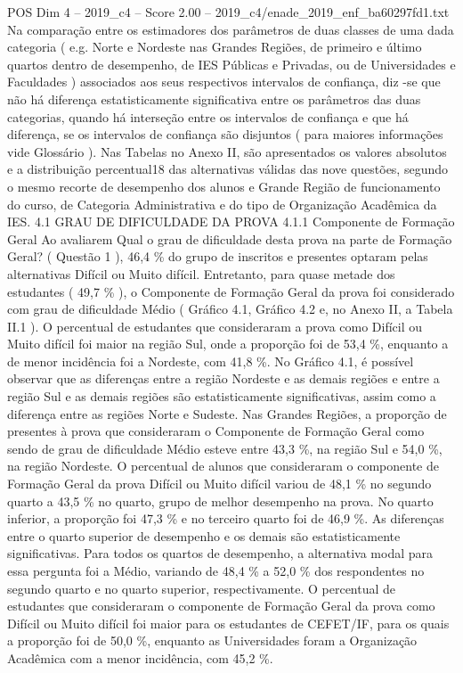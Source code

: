 \begin{textsample}{POS Dim 4 – 2019\_c4 – Score 2.00 – 2019\_c4/enade\_2019\_enf\_ba60297fd1.txt}
Na comparação entre os estimadores dos parâmetros de duas classes de uma dada categoria ( e.g.
Norte e Nordeste nas Grandes Regiões, de primeiro e último quartos dentro de desempenho, de IES Públicas e Privadas, ou de Universidades e Faculdades ) associados aos seus respectivos intervalos de confiança, diz -se que não há diferença estatisticamente significativa entre os parâmetros das duas categorias, quando há interseção entre os intervalos de confiança e que há diferença, se os intervalos de confiança são disjuntos ( para maiores informações vide Glossário ).
Nas Tabelas no Anexo II, são apresentados os valores absolutos e a distribuição percentual18 das alternativas válidas das nove questões, segundo o mesmo recorte de desempenho dos alunos e Grande Região de funcionamento do curso, de Categoria Administrativa e do tipo de Organização Acadêmica da IES. 4.1 GRAU DE DIFICULDADE DA PROVA 4.1.1 Componente de Formação Geral Ao avaliarem Qual o grau de dificuldade desta prova na parte de Formação Geral? ( Questão 1 ), 46,4 \% do grupo de inscritos e presentes optaram pelas alternativas Difícil ou Muito difícil.
Entretanto, para quase metade dos estudantes ( 49,7 \% ), o Componente de Formação Geral da prova foi considerado com grau de dificuldade Médio ( Gráfico 4.1, Gráfico 4.2 e, no Anexo II, a Tabela II.1 ).
O percentual de estudantes que consideraram a prova como Difícil ou Muito difícil foi maior na região Sul, onde a proporção foi de 53,4 \%, enquanto a de menor incidência foi a Nordeste, com 41,8 \%.
No Gráfico 4.1, é possível observar que as diferenças entre a região Nordeste e as demais regiões e entre a região Sul e as demais regiões são estatisticamente significativas, assim como a diferença entre as regiões Norte e Sudeste.
Nas Grandes Regiões, a proporção de presentes à prova que consideraram o Componente de Formação Geral como sendo de grau de dificuldade Médio esteve entre 43,3 \%, na região Sul e 54,0 \%, na região Nordeste.
O percentual de alunos que consideraram o componente de Formação Geral da prova Difícil ou Muito difícil variou de 48,1 \% no segundo quarto a 43,5 \% no quarto, grupo de melhor desempenho na prova.
No quarto inferior, a proporção foi 47,3 \% e no terceiro quarto foi de 46,9 \%.
As diferenças entre o quarto superior de desempenho e os demais são estatisticamente significativas.
Para todos os quartos de desempenho, a alternativa modal para essa pergunta foi a Médio, variando de 48,4 \% a 52,0 \% dos respondentes no segundo quarto e no quarto superior, respectivamente.
O percentual de estudantes que consideraram o componente de Formação Geral da prova como Difícil ou Muito difícil foi maior para os estudantes de CEFET/IF, para os quais a proporção foi de 50,0 \%, enquanto as Universidades foram a Organização Acadêmica com a menor incidência, com 45,2 \%.

\end{textsample}
